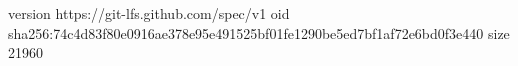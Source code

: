 version https://git-lfs.github.com/spec/v1
oid sha256:74c4d83f80e0916ae378e95e491525bf01fe1290be5ed7bf1af72e6bd0f3e440
size 21960
